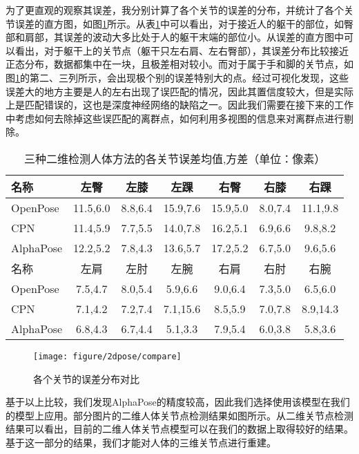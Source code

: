 为了更直观的观察其误差，我分别计算了各个关节的误差的分布，并统计了各个关节误差的直方图，如图\ref{fig:2d-loss}所示。从表\ref{tab:2derrorjoint}中可以看出，对于接近人的躯干的部位，如臀部和肩部，其误差的波动大多比处于人的躯干末端的部位小。从误差的直方图中可以看出，对于躯干上的关节点（躯干只左右肩、左右臀部），其误差分布比较接近正态分布，数据都集中在一块，且极差相对较小。而对于属于手和脚的关节点，如图\ref{fig:2d-loss}的第二、三列所示，会出现极个别的误差特别大的点。经过可视化发现，这些误差大的地方主要是人的左右出现了误匹配的情况，因此其置信度较大，但是实际上是匹配错误的，这也是深度神经网络的缺陷之一。因此我们需要在接下来的工作中考虑如何去除掉这些误匹配的离群点，如何利用多视图的信息来对离群点进行剔除。
\begin{table}[H]
    \centering
    \begin{tabular}{lcccccc}
        \hline
        名称      & 左臀     & 左膝    & 左踝     & 右臀     & 右膝    & 右踝     \\
        \hline
        OpenPose  & 11.5,6.0 & 8.8,6.4 & 15.9,7.6 & 15.9,5.0 & 8.0,7.4 & 11.1,9.8 \\
        CPN       & 11.4,5.9 & 7.7,5.5 & 14.0,7.8 & 16.2,5.1 & 6.9,6.6 & 9.8,8.2  \\
        AlphaPose & 12.2,5.2 & 7.8,4.3 & 13.6,5.7 & 17.2,5.2 & 6.7,5.0 & 9.6,5.6  \\
        \hline
        名称      & 左肩     & 左肘    & 左腕     & 右肩     & 右肘    & 右腕     \\
        \hline
        OpenPose  & 7.5,4.7  & 8.0,5.4 & 5.9,6.6  & 9.0,6.4  & 7.3,5.0 & 6.5,6.0  \\
        CPN       & 7.1,4.2  & 7.2,7.4 & 7.1,15.6 & 8.5,5.9  & 7.0,7.8 & 8.9,14.3 \\
        AlphaPose & 6.8,4.3  & 6.7,4.4 & 5.1,3.3  & 7.9,5.4  & 6.0,3.8 & 5.8,3.6  \\
        \hline
        \end{tabular}
    \caption{三种二维检测人体方法的各关节误差均值,方差（单位：像素）\label{tab:2derrorjoint}}
\end{table}


\begin{figure}[htbp]
    \centering
    \texttt{[image: figure/2dpose/compare]}
    \caption{\label{fig:2d-loss} 各个关节的误差分布对比}
\end{figure}

基于以上比较，我们发现AlphaPose的精度较高，因此我们选择使用该模型在我们的模型上应用。部分图片的二维人体关节点检测结果如图所示。从二维关节点检测结果可以看出，目前的二维人体关节点模型可以在我们的数据上取得较好的结果。基于这一部分的结果，我们才能对人体的三维关节点进行重建。

